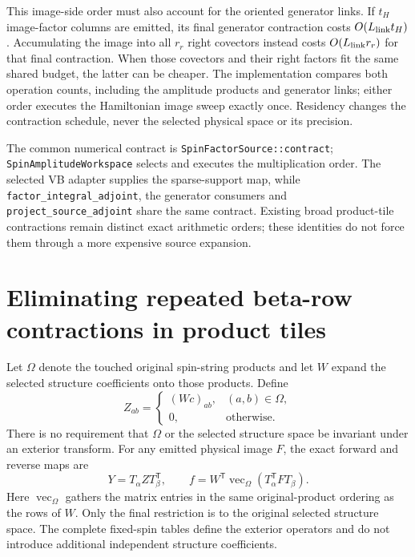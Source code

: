 \documentclass[11pt,a4paper]{article}
\newcommand{\Tr}{^{\mathsf T}}
\begin{document}
This image-side order must also account for the oriented generator links.
If $t_H$ image-factor columns are emitted, its final generator contraction
costs $O(L_{\rm link}t_H)$. Accumulating the image into all $r_r$ right
covectors instead costs $O(L_{\rm link}r_r)$ for that final contraction.
When those covectors and their right factors fit the same shared budget,
the latter can be cheaper. The implementation compares both operation
counts, including the amplitude products and generator links; either order
executes the Hamiltonian image sweep exactly once. Residency changes the
contraction schedule, never the selected physical space or its precision.

The common numerical contract is \texttt{SpinFactorSource::contract};
\texttt{SpinAmplitudeWorkspace} selects and executes the multiplication
order. The selected VB adapter supplies the sparse-support map, while
\texttt{factor\_integral\_adjoint}, the generator consumers and
\texttt{project\_source\_adjoint} share the same contract. Existing broad
product-tile contractions remain distinct exact arithmetic orders; these
identities do not force them through a more expensive source expansion.

\section{Eliminating repeated beta-row contractions in product tiles}
\label{sec:ordered-product}

Let $\Omega$ denote the touched original spin-string products and let $W$
expand the selected structure coefficients onto those products. Define
\begin{equation}
 Z_{ab}=\begin{cases}(Wc)_{ab},&(a,b)\in\Omega,\\0,&\text{otherwise}.
 \end{cases}
\end{equation}
There is no requirement that $\Omega$ or the selected structure space be
invariant under an exterior transform. For any emitted physical image $F$,
the exact forward and reverse maps are
\begin{equation}\label{eq:ordered-product}
 Y=T_\alpha ZT_\beta\Tr,\qquad
 f=W\Tr\operatorname{vec}_{\Omega}(T_\alpha\Tr F T_\beta).
\end{equation}
Here $\operatorname{vec}_{\Omega}$ gathers the matrix entries in the same
original-product ordering as the rows of $W$.
Only the final restriction is to the original selected structure space.
The complete fixed-spin tables define the exterior operators and do not
introduce additional independent structure coefficients.
\end{document}
